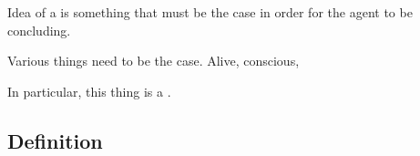 \section{}
\label{cha:requs:requs}

\begin{note}
  Idea of a \requ{} is something that must be the case in order for the agent to be concluding.

  Various things need to be the case.
  Alive, conscious, 

  In particular, this thing is a \fc{}.
\end{note}

\subsection{Definition}
\label{cha:requs:def}

